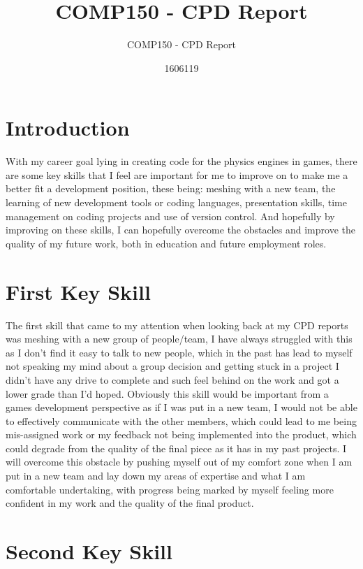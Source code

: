 \documentclass{scrartcl}
\title{COMP150 - CPD Report}
\subtitle{COMP150 - CPD Report}
\author{1606119}
\begin{document}
\maketitle

\section{Introduction}

With my career goal lying in creating code for the physics engines in games, there are some key skills that I feel are important for me to improve on to make me a better fit a development position, these being: meshing with a new team, the learning of new development tools or coding languages, presentation skills, time management on coding projects and use of version control. And hopefully by improving on these skills, I can hopefully overcome the obstacles and improve the quality of my future work, both in education and future employment roles.
\section{First Key Skill}

The first skill that came to my attention when looking back at my CPD reports was meshing with a new group of people/team, I have always struggled with this as I don't find it easy to talk to new people, which in the past has lead to myself not speaking my mind about a group decision and getting stuck in a project I didn't have any drive to complete and such feel behind on the work and got a lower grade than I'd hoped. Obviously this skill would be important from a games development perspective as if I was put in a new team, I would not be able to effectively communicate with the other members, which could lead to me being mis-assigned work or my feedback not being implemented into the product, which could degrade from the quality of the final piece as it has in my past projects. I will overcome this obstacle by pushing myself out of my comfort zone when I am put in a new team and lay down my areas of expertise and what I am comfortable undertaking, with progress being marked by myself feeling more confident in my work and the quality of the final product. 


\section{Second Key Skill}
\end{document}
